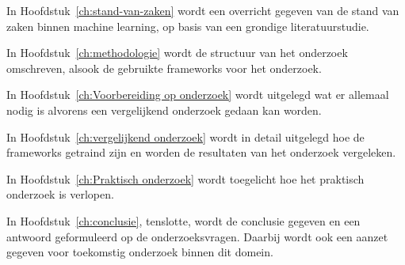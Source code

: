 In Hoofdstuk~\ref{ch:stand-van-zaken} wordt een overricht gegeven van de stand van zaken binnen machine learning, op basis van een grondige literatuurstudie. 

In Hoofdstuk~\ref{ch:methodologie} wordt de structuur van het onderzoek omschreven, alsook de gebruikte frameworks voor het onderzoek.

In Hoofdstuk~\ref{ch:Voorbereiding op onderzoek} wordt uitgelegd wat er allemaal nodig is alvorens een vergelijkend onderzoek gedaan kan worden. 

In Hoofdstuk~\ref{ch:vergelijkend onderzoek} wordt in detail uitgelegd hoe de frameworks getraind zijn en worden de resultaten van het onderzoek vergeleken.

In Hoofdstuk~\ref{ch:Praktisch onderzoek} wordt toegelicht hoe het praktisch onderzoek is verlopen.

In Hoofdstuk~\ref{ch:conclusie}, tenslotte, wordt de conclusie gegeven en een antwoord geformuleerd op de onderzoeksvragen. Daarbij wordt ook een aanzet gegeven voor toekomstig onderzoek binnen dit domein.



